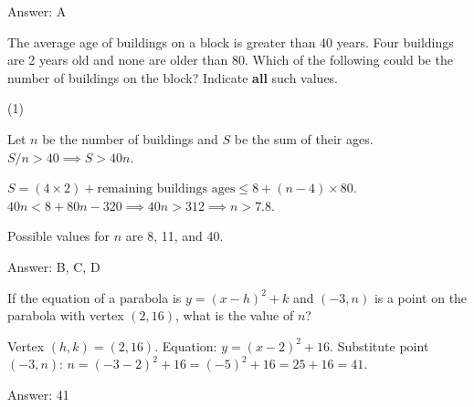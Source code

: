 \documentclass[11pt,paper=a4,answers]{exam}
\begin{document}
\begin{questions}
\begin{solution}
Answer: \colorbox{yellow!100}{A}
\end{solution}

\vspace{1cm}


\question
The average age of buildings on a block is greater than 40 years. Four buildings are 2 years old and none are older than 80. Which of the following could be the number of buildings on the block?
Indicate \textbf{all} such values.

\begin{tasks}(1)
\end{tasks}

\begin{solution}
Let $n$ be the number of buildings and $S$ be the sum of their ages. $S / n > 40 \implies S > 40n$.
\vspace{5pt}
\begin{center}
$S = (4 \times 2) + \text{remaining buildings ages} \leq 8 + (n - 4) \times 80$.
\vspace{5pt}
$40n < 8 + 80n - 320 \implies 40n > 312 \implies n > 7.8$.
\end{center}
Possible values for $n$ are 8, 11, and 40.

Answer: \colorbox{yellow!100}{B, C, D}
\end{solution}

\vspace{1cm}


\question
If the equation of a parabola is $y = (x - h)^2 + k$ and $(-3, n)$ is a point on the parabola with vertex $(2, 16)$, what is the value of $n$?

\begin{solution}
\begin{center}
Vertex $(h, k) = (2, 16)$.
\vspace{5pt}
Equation: $y = (x - 2)^2 + 16$.
\vspace{5pt}
Substitute point $(-3, n)$:
\vspace{5pt}
$n = (-3 - 2)^2 + 16 = (-5)^2 + 16 = 25 + 16 = 41$.
\end{center}

Answer: \colorbox{yellow!100}{41}
\end{solution}

\vspace{1cm}


\end{questions}
\end{document}
